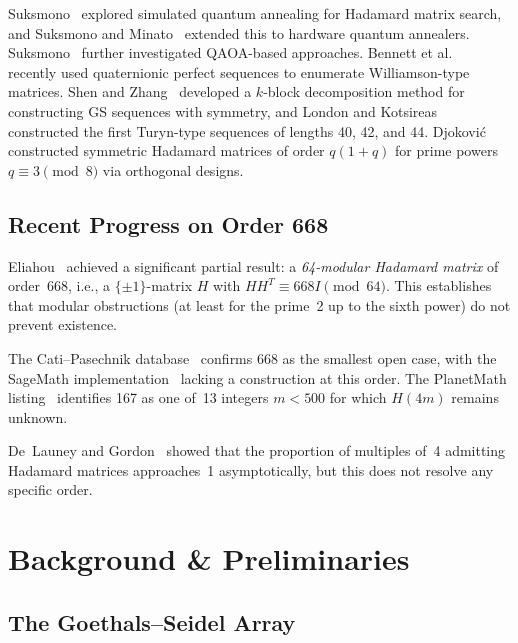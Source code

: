 \documentclass[11pt,a4paper]{article}
\begin{document}
Suksmono~\cite{suksmono2018quantum} explored simulated quantum annealing
for Hadamard matrix search, and Suksmono and
Minato~\cite{suksmono2019quantum} extended this to hardware quantum
annealers.  Suksmono~\cite{suksmono2025qaoa} further investigated
QAOA-based approaches.
Bennett et al.~\cite{bennett2026quaternionic} recently used
quaternionic perfect sequences to enumerate Williamson-type matrices.
Shen and Zhang~\cite{shen2024goethals} developed a $k$-block decomposition
method for constructing GS sequences with symmetry, and
London and Kotsireas~\cite{london2025turyn} constructed the first
Turyn-type sequences of lengths 40, 42, and 44.
Djokovi\'c~\cite{djokovic2025orthogonal} constructed symmetric Hadamard
matrices of order $q(1+q)$ for prime powers $q \equiv 3 \pmod{8}$ via
orthogonal designs.

\subsection{Recent Progress on Order 668}

Eliahou~\cite{eliahou2025modular} achieved a significant partial result: a
\emph{64-modular Hadamard matrix} of order~668, i.e., a $\{\pm1\}$-matrix
$H$ with $HH^T \equiv 668I \pmod{64}$.  This establishes that modular
obstructions (at least for the prime~2 up to the sixth power) do not
prevent existence.

The Cati--Pasechnik database~\cite{cati2024hadamard} confirms 668 as the
smallest open case, with the SageMath implementation~\cite{sagemath_hadamard}
lacking a construction at this order.  The PlanetMath
listing~\cite{planetmath_hadamard} identifies 167 as one of~13 integers
$m < 500$ for which $H(4m)$ remains unknown.

De~Launey and Gordon~\cite{delauney2010density} showed that the proportion
of multiples of~4 admitting Hadamard matrices approaches~1 asymptotically,
but this does not resolve any specific order.

\section{Background \& Preliminaries}\label{sec:background}

\subsection{The Goethals--Seidel Array}\label{sec:gs}
\end{document}
